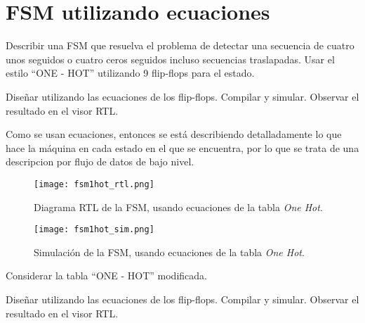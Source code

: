 \section{FSM utilizando ecuaciones \label{sec:s1}}



\begin{center}
	\begin{minipage}{10cm}
		Describir una FSM que resuelva el problema de detectar una secuencia de cuatro unos seguidos
		o cuatro ceros seguidos incluso secuencias traslapadas. Usar el estilo ``ONE - HOT'' utilizando 9 flip-flops para el estado.
		
		\enter
		
		Diseñar utilizando las ecuaciones de los flip-flops. Compilar y simular. Observar el resultado en el
		visor RTL.
	\end{minipage}
\end{center}


\enter

Como se usan ecuaciones, entonces se está describiendo detalladamente lo que hace 
la máquina en cada estado en el que se encuentra, por lo que se trata de una
descripcion por flujo de datos de bajo nivel.

\enter

\begin{figure}[ht]
	\centering
	\texttt{[image: fsm1hot\_rtl.png]}
	\caption{
		Diagrama RTL de la FSM, usando ecuaciones de la tabla \textit{One Hot}.
		\label{fig:fsm1hot_rtl}
	}
\end{figure}

\begin{figure}[ht]
	\centering
	\texttt{[image: fsm1hot\_sim.png]}
	\caption{
		Simulación de la FSM, usando ecuaciones de la tabla \textit{One Hot}.
		\label{fig:fsm1hot_sim}
	}
\end{figure}








\newpage
\begin{center}
	\begin{minipage}{10cm}
		Considerar la tabla ``ONE - HOT'' modificada.
		
		\enter
		
		Diseñar utilizando las ecuaciones de los flip-flops. Compilar y simular. Observar el resultado en el
		visor RTL.
	\end{minipage}
\end{center}

